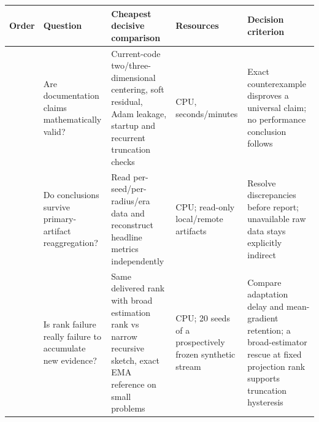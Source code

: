 \documentclass[
  british,
  10pt,
  a4paper,
]{article}
\newcounter{none} %
\begin{document}
{\def\LTcaptype{none} %
\begin{longtable}[]{@{}
  >{\raggedright\arraybackslash}p{}
  >{\raggedright\arraybackslash}p{}
  >{\raggedright\arraybackslash}p{}
  >{\raggedright\arraybackslash}p{}
  >{\raggedright\arraybackslash}p{}@{}}
\toprule\noalign{}
\begin{minipage}[b]{\linewidth}\raggedright
Order
\end{minipage} & \begin{minipage}[b]{\linewidth}\raggedright
Question
\end{minipage} & \begin{minipage}[b]{\linewidth}\raggedright
Cheapest decisive comparison
\end{minipage} & \begin{minipage}[b]{\linewidth}\raggedright
Resources
\end{minipage} & \begin{minipage}[b]{\linewidth}\raggedright
Decision criterion
\end{minipage} \\
\midrule\noalign{}
\endhead
\bottomrule\noalign{}
\endlastfoot
1 & Are documentation claims mathematically valid? &
Current-\allowbreak{}code
two/\allowbreak{}three-\allowbreak{}dimensional centering, soft
residual, Adam leakage, startup and recurrent truncation checks & CPU,
seconds/\allowbreak{}minutes & Exact counterexample disproves a
universal claim; no performance conclusion follows \\
2 & Do conclusions survive primary-\allowbreak{}artifact reaggregation?
& Read
per-\allowbreak{}seed/\allowbreak{}per-\allowbreak{}radius/\allowbreak{}era
data and reconstruct headline metrics independently & CPU; read-only
local/\allowbreak{}remote artifacts & Resolve discrepancies before
report; unavailable raw data stays explicitly indirect \\
3 & Is rank failure really failure to accumulate new evidence? & Same
delivered rank with broad estimation rank vs narrow recursive sketch,
exact EMA reference on small problems & CPU; 20 seeds of a prospectively
frozen synthetic stream & Compare adaptation delay and
mean-\allowbreak{}gradient retention; a broad-\allowbreak{}estimator
rescue at fixed projection rank supports truncation hysteresis \\

\end{longtable}}
\end{document}
